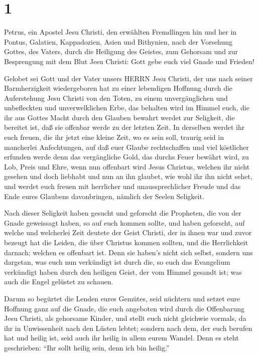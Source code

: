 \hypertarget{section}{%
\section{1}\label{section}}

 Petrus, ein Apostel Jesu Christi, den erwählten Fremdlingen
hin und her in Pontus, Galatien, Kappadozien, Asien und Bithynien,
 nach der Vorsehung Gottes, des Vaters, durch die Heiligung
des Geistes, zum Gehorsam und zur Besprengung mit dem Blut Jesu Christi:
Gott gebe euch viel Gnade und Frieden!

 Gelobet sei Gott und der Vater unsers HERRN Jesu Christi,
der uns nach seiner Barmherzigkeit wiedergeboren hat zu einer lebendigen
Hoffnung durch die Auferstehung Jesu Christi von den Toten, 
zu einem unvergänglichen und unbefleckten und unverwelklichen Erbe, das
behalten wird im Himmel  euch, die ihr aus Gottes Macht
durch den Glauben bewahrt werdet zur Seligkeit, die bereitet ist, daß
sie offenbar werde zu der letzten Zeit.  In derselben werdet
ihr euch freuen, die ihr jetzt eine kleine Zeit, wo es sein soll,
traurig seid in mancherlei Anfechtungen,  auf daß euer
Glaube rechtschaffen und viel köstlicher erfunden werde denn das
vergängliche Gold, das durchs Feuer bewährt wird, zu Lob, Preis und
Ehre, wenn nun offenbart wird Jesus Christus,  welchen ihr
nicht gesehen und doch liebhabt und nun an ihn glaubet, wie wohl ihr ihn
nicht sehet, und werdet euch freuen mit herrlicher und unaussprechlicher
Freude  und das Ende eures Glaubens davonbringen, nämlich
der Seelen Seligkeit.

 Nach dieser Seligkeit haben gesucht und geforscht die
Propheten, die von der Gnade geweissagt haben, so auf euch kommen
sollte,  und haben geforscht, auf welche und welcherlei
Zeit deutete der Geist Christi, der in ihnen war und zuvor bezeugt hat
die Leiden, die über Christus kommen sollten, und die Herrlichkeit
darnach;  welchen es offenbart ist. Denn sie haben's nicht
sich selbst, sondern uns dargetan, was euch nun verkündigt ist durch
die, so euch das Evangelium verkündigt haben durch den heiligen Geist,
der vom Himmel gesandt ist; was auch die Engel gelüstet zu schauen.

 Darum so begürtet die Lenden eures Gemütes, seid nüchtern
und setzet eure Hoffnung ganz auf die Gnade, die euch angeboten wird
durch die Offenbarung Jesu Christi,  als gehorsame Kinder,
und stellt euch nicht gleichwie vormals, da ihr in Unwissenheit nach den
Lüsten lebtet;  sondern nach dem, der euch berufen hat und
heilig ist, seid auch ihr heilig in allem eurem Wandel. 
Denn es steht geschrieben: ``Ihr sollt heilig sein, denn ich bin
heilig.''

